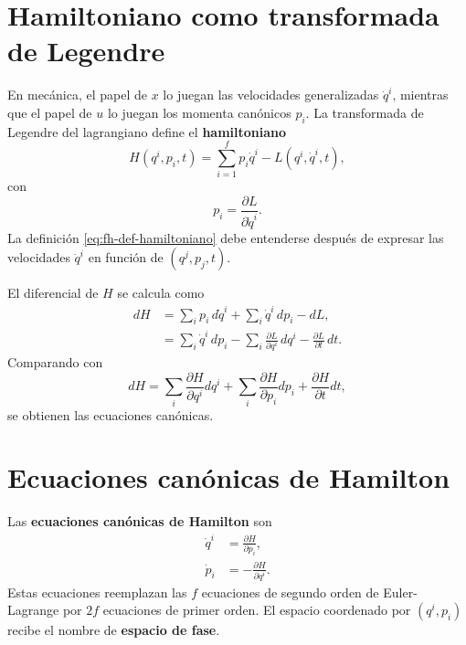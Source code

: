 \documentclass[../apunte_mecanica_clasica.tex]{subfiles}%
\begin{document}
\section{Hamiltoniano como transformada de Legendre}
\label{sec:fh-hamiltoniano-legendre}

En mecánica, el papel de $x$ lo juegan las velocidades generalizadas $\dot q^i$, mientras que el papel de $u$ lo juegan los momenta canónicos $p_i$. La transformada de Legendre del lagrangiano define el \textbf{hamiltoniano}
\begin{equation}
    H(q^i,p_i,t)=\sum_{i=1}^{f} p_i\dot q^i-L(q^i,\dot q^i,t),
    \label{eq:fh-def-hamiltoniano}
\end{equation}
con
\begin{equation}
    p_i=\frac{\partial L}{\partial \dot q^i}.
    \label{eq:fh-pi-def-legendre}
\end{equation}
La definición \eqref{eq:fh-def-hamiltoniano} debe entenderse después de expresar las velocidades $\dot q^i$ en función de $(q^j,p_j,t)$.

El diferencial de $H$ se calcula como
\begin{align}
    dH &= \sum_i p_i\,d\dot q^i+\sum_i \dot q^i\,dp_i-dL, \label{eq:fh-dh-uno}\\
       &= \sum_i \dot q^i\,dp_i-\sum_i \frac{\partial L}{\partial q^i}\,dq^i-\frac{\partial L}{\partial t}\,dt. \label{eq:fh-dh-dos}
\end{align}
Comparando con
\begin{equation}
    dH=\sum_i \frac{\partial H}{\partial q^i}dq^i+
    \sum_i \frac{\partial H}{\partial p_i}dp_i+
    \frac{\partial H}{\partial t}dt,
    \label{eq:fh-dh-general}
\end{equation}
se obtienen las ecuaciones canónicas.

\section{Ecuaciones canónicas de Hamilton}
\label{sec:fh-ecuaciones-canonicas}

Las \textbf{ecuaciones canónicas de Hamilton} son
\begin{align}
    \dot q^i &= \frac{\partial H}{\partial p_i},
    \label{eq:fh-hamilton-q}\\
    \dot p_i &= -\frac{\partial H}{\partial q^i}.
    \label{eq:fh-hamilton-p}
\end{align}
Estas ecuaciones reemplazan las $f$ ecuaciones de segundo orden de Euler-Lagrange por $2f$ ecuaciones de primer orden. El espacio coordenado por $(q^i,p_i)$ recibe el nombre de \textbf{espacio de fase}.
\end{document}
